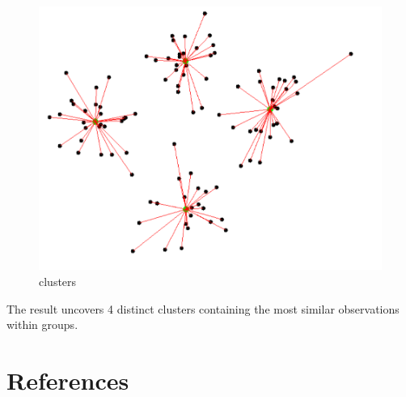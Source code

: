 \documentclass[
  letterpaper,
  DIV=11,
  numbers=noendperiod]{scrreprt}
\begin{document}
\begin{figure}

{\centering \includegraphics{./clusters.png}

}

\caption{\label{fig-clusters}clusters}

\end{figure}

The result uncovers 4 distinct clusters containing the most similar
observations within groups.


\hypertarget{references}{%
\chapter*{References}\label{references}}

\end{document}
